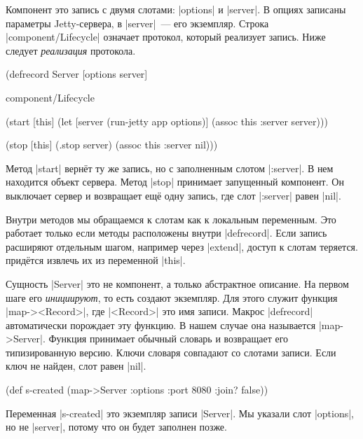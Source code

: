 Компонент это запись с двумя слотами: \spverb|options| и \spverb|server|. В
опциях записаны параметры Jetty-сервера, в \spverb|server|~--- его
экземпляр. Строка \spverb|component/Lifecycle| означает протокол, который
реализует запись. Ниже следует \emph{реализация} протокола.

\begin{english}
  \begin{clojure}
(defrecord Server [options server]

  component/Lifecycle

  (start [this]
    (let [server (run-jetty app options)]
      (assoc this :server server)))

  (stop [this]
    (.stop server)
    (assoc this :server nil)))
  \end{clojure}
\end{english}

Метод \spverb|start| верн\"{е}т ту же запись, но с заполненным слотом
\spverb|:server|. В нем находится объект сервера. Метод \spverb|stop| принимает
запущенный компонент. Он выключает сервер и возвращает ещ\"{е} одну запись, где слот
\spverb|:server| равен \spverb|nil|.

Внутри методов мы обращаемся к слотам как к локальным переменным. Это работает
только если методы расположены внутри \spverb|defrecord|. Если запись расширяют
отдельным шагом, например через \spverb|extend|, доступ к слотам
теряется. прид\"{е}тся извлечь их из переменной \spverb|this|.

Сущность \spverb|Server| это не компонент, а только абстрактное описание. На
первом шаге его \emph{инициируют}, то есть создают экземпляр. Для этого служит
функция \spverb|map-><Record>|, где \spverb|<Record>| это имя записи. Макрос
\spverb|defrecord| автоматически порождает эту функцию. В нашем случае она
называется \spverb|map->Server|. Функция принимает обычный словарь и возвращает
его типизированную версию. Ключи словаря совпадают со слотами записи. Если ключ
не найден, слот равен \spverb|nil|.

\begin{english}
  \begin{clojure}
(def s-created
  (map->Server
   {:options {:port 8080 :join? false}}))
  \end{clojure}
\end{english}

Переменная \spverb|s-created| это экземпляр записи \spverb|Server|. Мы указали
слот \spverb|options|, но не \spverb|server|, потому что он будет заполнен
позже.

